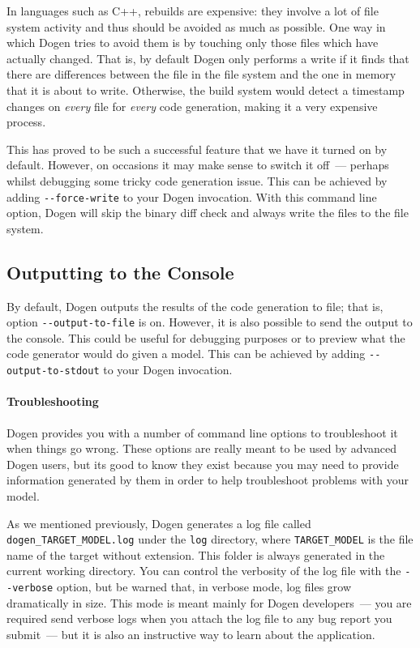 \documentclass{book}
\begin{document}
In languages such as C++, rebuilds are expensive: they involve a lot
of file system activity and thus should be avoided as much as
possible. One way in which Dogen tries to avoid them is by touching
only those files which have actually changed. That is, by default
Dogen only performs a write if it finds that there are differences
between the file in the file system and the one in memory that it is
about to write. Otherwise, the build system would detect a timestamp
changes on \emph{every} file for \emph{every} code generation, making
it a very expensive process.

This has proved to be such a successful feature that we have it turned
on by default. However, on occasions it may make sense to switch it
off~--- perhaps whilst debugging some tricky code generation
issue. This can be achieved by adding \texttt{-{}-force-write} to your
Dogen invocation. With this command line option, Dogen will skip the
binary diff check and always write the files to the file system.

\subsection{Outputting to the Console}

By default, Dogen outputs the results of the code generation to file;
that is, option \texttt{-{}-output-to-file} is on. However, it is also
possible to send the output to the console. This could be useful for
debugging purposes or to preview what the code generator would do
given a model. This can be achieved by adding
\texttt{-{}-output-to-stdout} to your Dogen invocation.

\paragraph{Troubleshooting}

Dogen provides you with a number of command line options to
troubleshoot it when things go wrong. These options are really meant
to be used by advanced Dogen users, but its good to know they exist
because you may need to provide information generated by them in order
to help troubleshoot problems with your model.

As we mentioned previously, Dogen generates a log file called
\texttt{dogen\_TARGET\_MODEL.log} under the \texttt{log} directory,
where \texttt{TARGET\_MODEL} is the file name of the target without
extension. This folder is always generated in the current working
directory. You can control the verbosity of the log file with the
\texttt{-{}-verbose} option, but be warned that, in verbose mode, log
files grow dramatically in size. This mode is meant mainly for Dogen
developers~--- you are required send verbose logs when you attach the
log file to any bug report you submit~--- but it is also an
instructive way to learn about the application.
\end{document}
